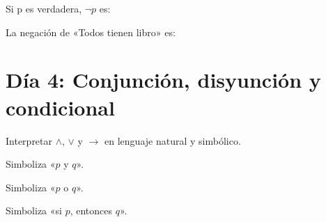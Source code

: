 \begin{activity}[id=dia-03-opcion-01,type=choice,weight=1]

Si p es verdadera, \(\neg p\) es:





\end{activity}

\begin{activity}[id=dia-03-opcion-02,type=choice,weight=1]

La negación de «Todos tienen libro» es:





\end{activity}

\section{Día 4: Conjunción, disyunción y condicional}

\begin{lesson}[id=dia-04-lectura,weight=0]

Interpretar \(\land\), \(\lor\) y \(\to\) en lenguaje natural y simbólico.

\end{lesson}

\begin{activity}[id=dia-04-corta-01,type=short,weight=1]

Simboliza «\(p\) y \(q\)».

\end{activity}

\begin{activity}[id=dia-04-corta-02,type=short,weight=1]

Simboliza «\(p\) o \(q\)».

\end{activity}

\begin{activity}[id=dia-04-corta-03,type=short,weight=1]

Simboliza «si \(p\), entonces \(q\)».

\end{activity}

